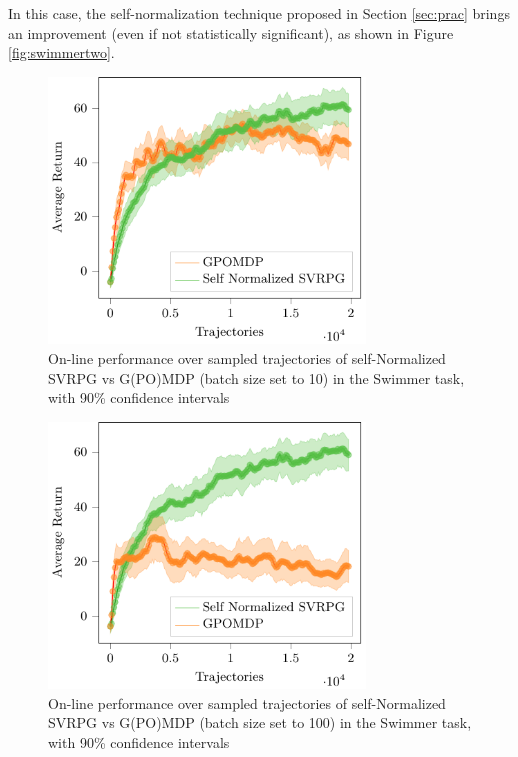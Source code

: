  In this case, the self-normalization technique proposed in Section \ref{sec:prac} brings an improvement (even if not statistically significant), as shown in Figure \ref{fig:swimmertwo}.
\begin{figure}[h]
	\begin{minipage}[h]{1\textwidth}
		\centering
		\includegraphics[width=0.75\textwidth]{Images/Experiments/swimmer_self_normalized_SVRPG_vs_GPOMDP_tex.pdf}
		\vspace{-0.1in}
		\caption{On-line performance over sampled trajectories of self-Normalized \acs{SVRPG} vs G(PO)MDP (batch size set to 10) in the Swimmer task, with 90\% confidence intervals}
		\label{fig:swimmerone}
	\end{minipage}
	\vspace{-0.15in}
\end{figure}
\begin{figure}[h]
	\begin{minipage}[h]{1\textwidth}
		\centering
		\includegraphics[width=0.75\textwidth]{Images/Experiments/swimmer_GPOMDP_100_vs_SN_SVRPG.pdf}
		\vspace{-0.1in}
		\caption{On-line performance over sampled trajectories of self-Normalized \acs{SVRPG} vs G(PO)MDP (batch size set to 100) in the Swimmer task, with 90\% confidence intervals}
		\label{fig:swimmer100}
	\end{minipage}
	\vspace{-0.15in}
\end{figure}
